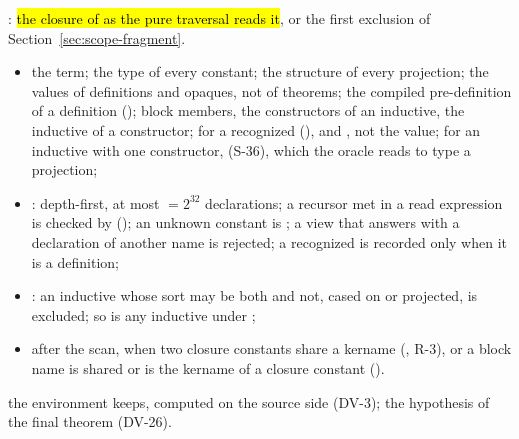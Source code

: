 \begin{definition}
  \label{def:Erasure-collectDeps}
  \leanok
   : \hl{the closure of  as the pure
  traversal reads it}, or the first exclusion of Section~\ref{sec:scope-fragment}.
  \begin{itemize}
  \item {} the term; the type of every constant; the structure of every projection; the values of definitions and opaques,
        not of theorems; the compiled pre-definition of a definition (); block members, the constructors of an inductive, the inductive of a
        constructor; for a recognized  (),  and
        , not the value; for an inductive  with one constructor, 
        (S-36), which the oracle reads to type a projection;
  \item {}: depth-first, at most  $= 2^{32}$ declarations; a
        recursor met in a read expression is checked by  (); an unknown constant is
        ; a view that answers with a declaration of another name is rejected;
        a recognized  is recorded only when it is a definition;
  \item {}: an inductive whose sort may be both  and not,
        cased on or projected, is excluded; so is any inductive under
        ;
  \item {} after the scan,  when two closure constants share a
        kername (, R-3), or a block name is shared or is the kername of a
        closure constant ().
  \end{itemize}
   the environment  keeps, computed on the source side
  (DV-3); the hypothesis  of the final theorem (DV-26).
\end{definition}

